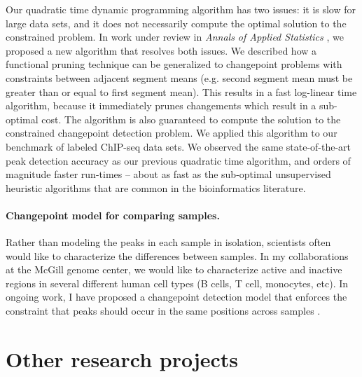 \documentclass{article}
\begin{document}
Our quadratic time dynamic programming algorithm has two issues: it is
slow for large data sets, and it does not necessarily compute the
optimal solution to the constrained problem. In work under review in
\emph{Annals of Applied Statistics}
\citep{Hocking-constrained-changepoint-detection}, we proposed a new
algorithm that resolves both issues. We described how a functional
pruning technique can be generalized to changepoint problems with
constraints between adjacent segment means (e.g. second segment mean
must be greater than or equal to first segment mean). This results in a fast
log-linear time algorithm, because it immediately prunes changements
which result in a sub-optimal cost. The algorithm is also guaranteed
to compute the solution to the constrained changepoint detection
problem. We applied this algorithm to our benchmark of labeled
ChIP-seq data sets. We observed the same state-of-the-art peak
detection accuracy as our previous quadratic time algorithm, and
orders of magnitude faster run-times -- about as fast as the
sub-optimal unsupervised heuristic algorithms that are common 
in the bioinformatics literature.

\paragraph{Changepoint model for comparing samples.}
Rather than modeling the peaks in each sample in isolation, scientists
often would like to characterize the differences between samples. In
my collaborations at the McGill genome center, we would like to
characterize active and inactive regions in several different human
cell types (B cells, T cell, monocytes, etc). In ongoing work, I have
proposed a changepoint detection model that enforces the constraint that peaks
should occur in the same positions across samples
\citep{HOCKING-PeakSegJoint}.

\section{Other research projects}

\end{document}
